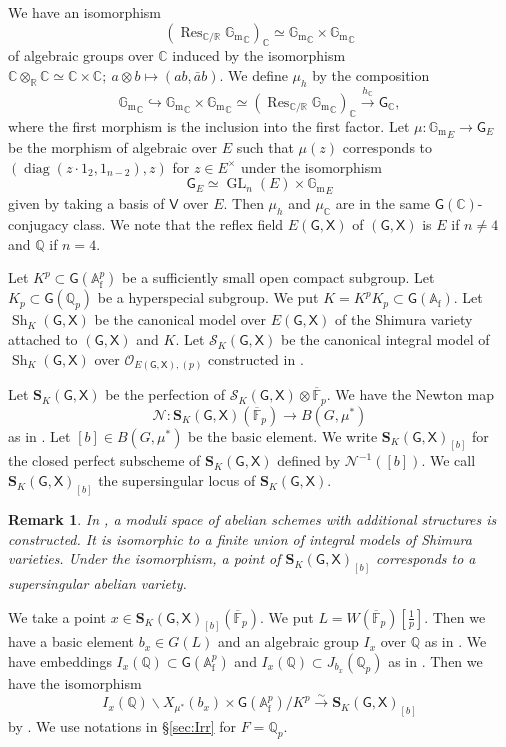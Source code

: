 \documentclass[12pt,a4paper]{article}
\newtheorem{rem}[thm]{Remark}
\DeclareMathOperator{\diag}{diag}
\DeclareMathOperator{\Res}{Res}
\DeclareMathOperator{\Sh}{Sh}
\DeclareMathOperator{\GL}{GL}
\newcommand{\bC}{\mathbb{C}}
\newcommand{\bF}{\mathbb{F}}
\newcommand{\bQ}{\mathbb{Q}}
\newcommand{\bR}{\mathbb{R}}
\newcommand{\bfS}{\mathbf{S}}
\newcommand{\cN}{\mathcal{N}}
\newcommand{\cO}{\mathcal{O}}
\newcommand{\sS}{\mathscr{S}}
\newcommand{\sfG}{\mathsf{G}}
\newcommand{\sfV}{\mathsf{V}}
\newcommand{\sfX}{\mathsf{X}}
\newcommand{\ol}{\overline}
\newcommand{\xra}{\xrightarrow}
\newcommand{\Gm}{\mathbb{G}_{\mathrm{m}}}
\newcommand{\Af}{\mathbb{A}_{\mathrm{f}}}
\begin{document}
We have an isomorphism 
\[
 (\Res_{\bC/\bR} {\Gm}_{\bC})_{\bC} 
 \simeq {\Gm}_{\bC} \times {\Gm}_{\bC} 
\]
of algebraic groups over $\bC$ induced by the isomorphism 
$\bC \otimes_{\bR} \bC \simeq \bC \times \bC;\ a \otimes b \mapsto (ab,\bar{a}b)$. 
We define $\mu_h$ by the composition 
\[
 {\Gm}_{\bC} \hookrightarrow 
 {\Gm}_{\bC} \times {\Gm}_{\bC} 
 \simeq (\Res_{\bC/\bR} {\Gm}_{\bC})_{\bC} \xra{h_{\bC}} 
 \sfG_{\bC} , 
\]
where the first morphism is the inclusion into the first factor. 
Let $\mu \colon {\Gm}_E \to \sfG_E$ 
be the morphism of algebraic 
over $E$ such that 
$\mu(z)$ corresponds to 
$(\diag (z \cdot 1_2, 1_{n-2}),z)$ 
for $z \in E^{\times}$ 
under the isomorphism 
\[
 \sfG_E \simeq \GL_n (E) \times {\Gm}_E 
\]
given by taking a basis of $\sfV$ over $E$. 
Then $\mu_h$ and $\mu_{\bC}$ 
are in the same $\sfG (\bC)$-conjugacy class. 
We note that the reflex field 
$E(\sfG,\sfX)$ of $(\sfG,\sfX)$ is 
$E$ if $n \neq 4$ and $\bQ$ if $n=4$. 

Let $K^p \subset \sfG (\Af^p )$ be a sufficiently small open compact subgroup. 
Let $K_p \subset \sfG (\bQ_p )$ be a hyperspecial subgroup. 
We put $K=K^p K_p \subset \sfG (\Af )$. 
Let $\Sh_K (\sfG,\sfX)$ be the canonical model over 
$E(\sfG,\sfX)$ of the Shimura variety attached to 
$(\sfG,\sfX)$ and $K$. 
Let $\sS_K (\sfG,\sfX)$ be the canonical integral model of 
$\Sh_K (\sfG,\sfX)$ over 
$\cO_{E(\sfG,\sfX),(p)}$ constructed in 
\cite{KisIntShab}. 

Let $\bfS_{K}(\sfG,\sfX)$ be the perfection of 
$\sS_K (\sfG,\sfX) \otimes \ol{\bF}_p$. 
We have the Newton map 
\[
 \cN \colon \bfS_{K}(\sfG,\sfX) (\ol{\bF}_p) \to B(G,\mu^* )  
\]
as in \cite[7.2.7]{XiZhCycSh}. 
Let $[b] \in B(G,\mu^* )$ be the basic element. 
We write $\bfS_{K}(\sfG,\sfX)_{[b]}$ for the 
closed perfect subscheme of $\bfS_{K}(\sfG,\sfX)$ 
defined by $\cN^{-1}([b])$. 
We call $\bfS_{K}(\sfG,\sfX)_{[b]}$ the supersingular locus of 
$\bfS_{K}(\sfG,\sfX)$. 

\begin{rem}
In \cite{KotPointSh}, a moduli space of abelian schemes with additional structures is constructed. 
It is isomorphic to 
a finite union of integral models of Shimura varieties. 
Under the isomorphism, a point of 
$\bfS_{K}(\sfG,\sfX)_{[b]}$ corresponds to 
a supersingular abelian variety. 
\end{rem}

We take a point $x \in \bfS_{K}(\sfG,\sfX)_{[b]}(\ol{\bF}_p)$. 
We put $L=W(\ol{\bF}_p)[\frac{1}{p}]$. 
Then we have a basic element $b_x \in G(L)$ 
and an algebraic group $I_x$ over $\bQ$ 
as in 
\cite[7.2.9]{XiZhCycSh}. 
We have embeddings 
$I_x(\bQ) \subset \sfG (\Af^p)$ and  
$I_x(\bQ) \subset J_{b_x} (\bQ_p)$ 
as in \cite[7.2.13]{XiZhCycSh}. 
Then we have the isomorphism 
\begin{equation}\label{eq:unifss}
 I_x(\bQ) \backslash X_{\mu^*} (b_x) \times \sfG (\Af^p) 
 / K^p \xrightarrow{\sim} \bfS_{K}(\sfG,\sfX)_{[b]} 
\end{equation}
by \cite[Corollary 7.2.16]{XiZhCycSh}.
We use notations in \S \ref{sec:Irr} for $F=\bQ_p$. 
\end{document}
